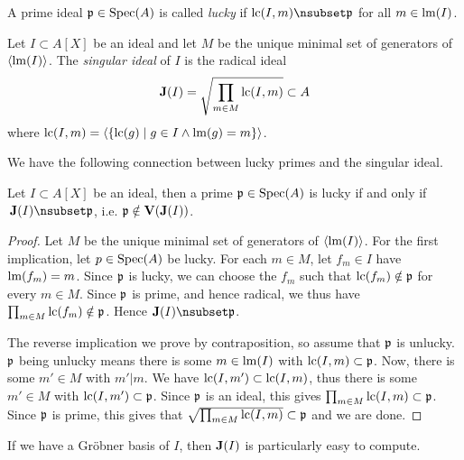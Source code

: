 \begin{definition}\label{def:lucky}
  A prime ideal $\mathfrak p \in \operatorname{Spec}(A)$ is called \textit{lucky} if $\LC(I, m) \nsubset \p$ for all $m \in \operatorname{lm}(I)$.
\end{definition}

\begin{definition}
  Let $I \subset A[X]$ be an ideal and let $M$ be the unique minimal set of generators of $\langle \operatorname{lm}(I) \rangle$. The \textit{singular ideal} of $I$ is the radical ideal
  \[\operatorname{\mathbf J}(I) = \sqrt{\prod_{m \in M} \operatorname{lc}(I, m)} \subset A\]
  where $\operatorname{lc}(I, m) = \langle \{\operatorname{lc}(g) \mid g \in I \land \operatorname{lm}(g) = m\} \rangle$.
\end{definition}

We have the following connection between lucky primes and the singular ideal.

\begin{lemma}\label{lem:lucky_iff_not_singular}
  Let $I \subset A[X]$ be an ideal, then a prime $\mathfrak p \in \operatorname{Spec}(A)$ is lucky if and only if $\,\J(I) \nsubset \p$, i.e. $\mathfrak p \notin \operatorname{\mathbf V}(\operatorname{\mathbf J}(I))$.
\end{lemma}
\begin{proof}
  Let $M$ be the unique minimal set of generators of $\langle \operatorname{lm}(I) \rangle$. For the first implication, let $p \in \operatorname{Spec}(A)$ be lucky. For each $m \in M$, let $f_{m} \in I$ have $\operatorname{lm}(f_{m}) = m$. Since $\mathfrak p$ is lucky, we can choose the $f_{m}$ such that $\operatorname{lc}(f_{m}) \notin \mathfrak p$ for every $m \in M$. Since $\mathfrak p$ is prime, and hence radical, we thus have $\prod_{m \in M} \operatorname{lc}(f_{m}) \notin \mathfrak p$. Hence $\J(I) \nsubset \p$.

  The reverse implication we prove by contraposition, so assume that $\mathfrak p$ is unlucky. $\mathfrak p$ being unlucky means there is some $m \in \operatorname{lm}(I)$ with $\operatorname{lc}(I, m) \subset \mathfrak p$. Now, there is some $m' \in M$ with $m' | m$. We have $\operatorname{lc}(I, m') \subset \operatorname{lc}(I, m)$, thus there is some $m' \in M$ with $\operatorname{lc}(I, m') \subset \mathfrak p$. Since $\mathfrak p$ is an ideal, this gives $\prod_{m \in M} \operatorname{lc}(I, m) \subset \mathfrak p$. Since $\mathfrak p$ is prime, this gives that $\sqrt{\prod_{m \in M} \operatorname{lc}(I, m)} \subset \mathfrak p$ and we are done.
\end{proof}



If we have a Gröbner basis of $I$, then $\operatorname{\mathbf J}(I)$ is particularly easy to compute.

